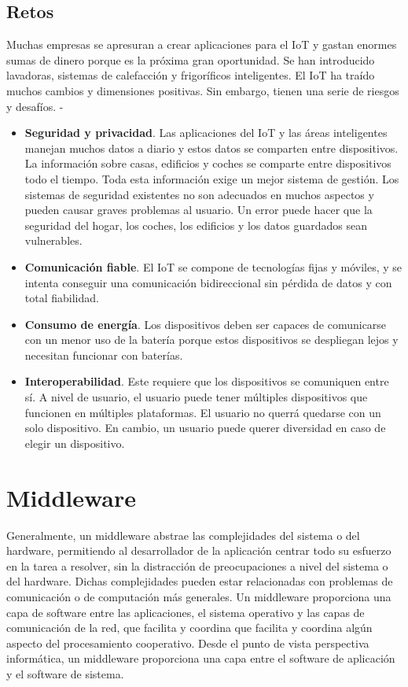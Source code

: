 {\subsection{Retos}

Muchas empresas se apresuran a crear aplicaciones para el IoT y gastan enormes sumas de dinero porque es la próxima gran oportunidad. Se han introducido lavadoras, sistemas de calefacción y frigoríficos inteligentes. El IoT ha traído muchos cambios y dimensiones positivas. Sin embargo, tienen una serie de riesgos y desafíos. \cite{8320780}-\cite{tripathy2017internet}

\begin{itemize}
    \item \textbf{Seguridad y privacidad}. Las aplicaciones del IoT y las áreas inteligentes manejan muchos datos a diario y estos datos se comparten entre dispositivos. La información sobre casas, edificios y coches se comparte entre dispositivos todo el tiempo. Toda esta información exige un mejor sistema de gestión. Los sistemas de seguridad existentes no son adecuados en muchos aspectos y pueden causar graves problemas al usuario. Un error puede hacer que la seguridad del hogar, los coches, los edificios y los datos guardados sean vulnerables.
    \item \textbf{Comunicación fiable}. El IoT se compone de tecnologías fijas y móviles, y se intenta conseguir una comunicación bidireccional sin pérdida de datos y con total fiabilidad.
    \item \textbf{Consumo de energía}. Los dispositivos deben ser capaces de comunicarse con un menor uso de la batería porque estos dispositivos se despliegan lejos y necesitan funcionar con baterías.
    \item \textbf{Interoperabilidad}. Este requiere que los dispositivos se comuniquen entre sí. A nivel de usuario, el usuario puede tener múltiples dispositivos que funcionen en múltiples plataformas. El usuario no querrá quedarse con un solo dispositivo. En cambio, un usuario puede querer diversidad en caso de elegir un dispositivo.
\end{itemize}


\section{Middleware}

Generalmente, un middleware abstrae las complejidades del sistema o del hardware, permitiendo al desarrollador de la aplicación centrar todo su esfuerzo en la tarea a resolver, sin la distracción de preocupaciones a nivel del sistema o del hardware. Dichas complejidades pueden estar relacionadas con problemas de comunicación o de computación más generales. Un middleware proporciona una capa de software entre las aplicaciones, el sistema operativo y las capas de comunicación de la red, que facilita y coordina que facilita y coordina algún aspecto del procesamiento cooperativo. Desde el punto de vista perspectiva informática, un middleware proporciona una capa entre el software de aplicación y el software de sistema.\\

}
